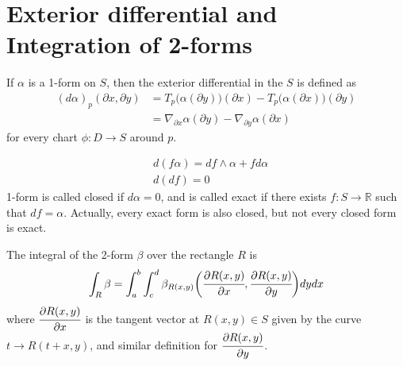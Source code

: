 \documentclass[10pt]{article}
\begin{document}
	\section{Exterior differential and Integration of 2-forms}\label{Sec:Exterior differential and Integration of 2-forms}
		\begin{definition}
			If $\alpha$ is a 1-form on $S$, then the exterior differential in the $S$ is defined as
			\begin{equation*}
				\begin{aligned}
					(d\alpha)_p(\partial x, \partial y) &= T_p\big( \alpha(\partial y)\big)(\partial x) - T_p\big( \alpha(\partial x)\big)(\partial y) \\
					&= \nabla_{\partial x}\alpha(\partial y) - \nabla_{\partial y}\alpha(\partial x)
				\end{aligned}
			\end{equation*}
			for every chart $\phi: D\rightarrow S$ around $p$.
		\end{definition}
		\begin{remark}
			\begin{equation*}
				\begin{aligned}
					&d(f\alpha) = df\wedge\alpha + fd\alpha \\
					&d(df) = 0
				\end{aligned}
			\end{equation*}
			1-form is called closed if $d\alpha=0$, and is called exact if there exists $f: S\rightarrow\mathbb{R}$ such that $df = \alpha$. Actually, every exact form is also closed, but not every closed form is exact.
		\end{remark}
		\begin{definition}
			The integral of the 2-form $\beta$ over the rectangle $R$ is 
			\begin{equation*}
				\begin{aligned}
					\int_{R}\beta = \int_{a}^{b}\int_{c}^{d}\beta_{R(x,y)}\bigg( \cfrac{\partial R(x,y)}{\partial x}, \cfrac{\partial R(x,y)}{\partial y} \bigg) dydx
				\end{aligned}
			\end{equation*}
			where $\cfrac{\partial R(x,y)}{\partial x}$ is the tangent vector at $R(x,y)\in S$ given by the curve $t\rightarrow R(t+x, y)$, and similar definition for $\cfrac{\partial R(x,y)}{\partial y}$.
		\end{definition}
		
\end{document}
